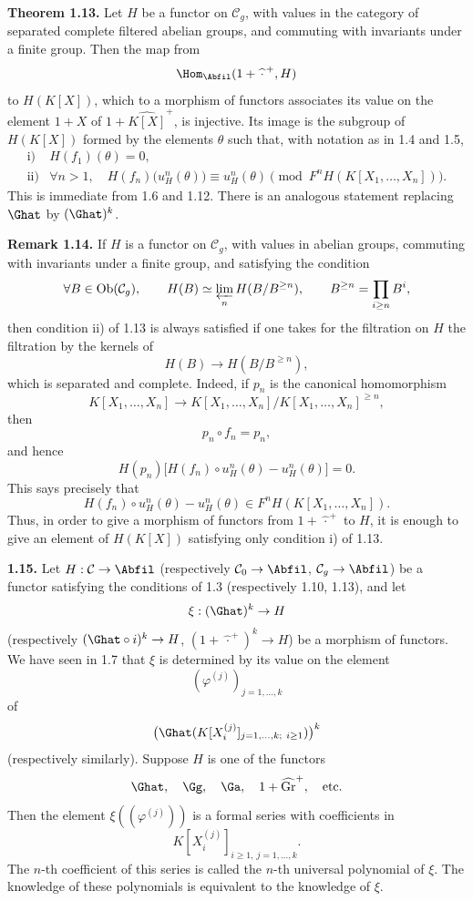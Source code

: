 \textbf{Theorem 1.13.} Let \(H\) be a functor on \(\mathcal C_g\), with values in the category of separated complete filtered abelian groups, and commuting with invariants under a finite group. Then the map from
\[
  \Hom_{\Abfil}(1+\widehat{\,\cdot\,}^{+},H)
\]
to \(H(K[X])\), which to a morphism of functors associates its value on the element \(1+X\) of \(1+\widehat{K[X]}^{+}\), is injective. Its image is the subgroup of \(H(K[X])\) formed by the elements \(\theta\) such that, with notation as in 1.4 and 1.5,
\[
\begin{array}{ll}
\text{i)}&H(f_1)(\theta)=0,\\[0.3em]
\text{ii)}&\forall n>1,\quad
H(f_n)\bigl(u_H^n(\theta)\bigr)\equiv u_H^n(\theta)
 \pmod{F^nH(K[X_1,\ldots,X_n])}.
\end{array}
\]
This is immediate from 1.6 and 1.12. There is an analogous statement replacing \(\Ghat\) by \((\Ghat)^k\).

\textbf{Remark 1.14.} If \(H\) is a functor on \(\mathcal C_g\), with values in abelian groups, commuting with invariants under a finite group, and satisfying the condition
\[
  \forall B\in\operatorname{Ob}(\mathcal C_g),\qquad
  H(B)\simeq \varprojlim_n H(B/B^{\geq n}),
  \qquad B^{\geq n}=\prod_{i\geq n}B^i,
\]
then condition ii) of 1.13 is always satisfied if one takes for the filtration on \(H\) the filtration by the kernels of
\[
  H(B)\longrightarrow H(B/B^{\geq n}),
\]
which is separated and complete. Indeed, if \(p_n\) is the canonical homomorphism
\[
  K[X_1,\ldots,X_n]\longrightarrow K[X_1,\ldots,X_n]/K[X_1,\ldots,X_n]^{\geq n},
\]
then
\[
  p_n\circ f_n=p_n,
\]
and hence
\[
  H(p_n)\bigl[H(f_n)\circ u_H^n(\theta)-u_H^n(\theta)\bigr]=0.
\]
This says precisely that
\[
  H(f_n)\circ u_H^n(\theta)-u_H^n(\theta)
  \in F^nH(K[X_1,\ldots,X_n]).
\]
Thus, in order to give a morphism of functors from \(1+\widehat{\,\cdot\,}^{+}\) to \(H\), it is enough to give an element of \(H(K[X])\) satisfying only condition i) of 1.13.

\textbf{1.15.} Let \(H:\mathcal C\to\Abfil\) (respectively \(\mathcal C_0\to\Abfil\), \(\mathcal C_g\to\Abfil\)) be a functor satisfying the conditions of 1.3 (respectively 1.10, 1.13), and let
\[
  \xi:(\Ghat)^k\to H
\]
(respectively \((\Ghat\circ i)^k\to H\), \((1+\widehat{\,\cdot\,}^{+})^k\to H\)) be a morphism of functors. We have seen in 1.7 that \(\xi\) is determined by its value on the element
\[
  (\varphi^{(j)})_{j=1,\ldots,k}
\]
of
\[
  \bigl(\Ghat(K[X_i^{(j)}]_{j=1,\ldots,k;\ i\geq 1})\bigr)^k
\]
(respectively similarly). Suppose \(H\) is one of the functors
\[
  \Ghat,\quad \Gg,\quad \Ga,\quad 1+\widehat{\operatorname{Gr}}^{+},\quad\text{etc.}
\]
Then the element \(\xi((\varphi^{(j)}))\) is a formal series with coefficients in
\[
  K[X_i^{(j)}]_{i\geq 1,\ j=1,\ldots,k}.
\]
The \(n\)-th coefficient of this series is called the \(n\)-th universal polynomial of \(\xi\). The knowledge of these polynomials is equivalent to the knowledge of \(\xi\).


